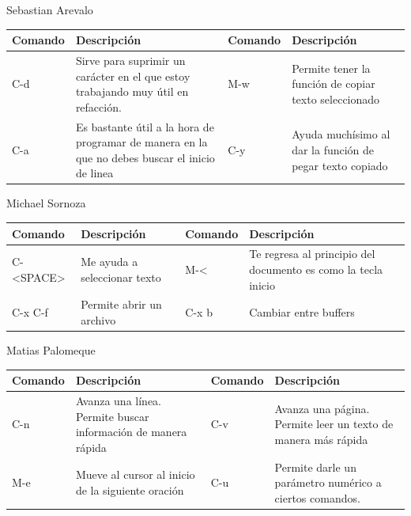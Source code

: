 \documentclass[11pt]{article}
\begin{document}
Sebastian Arevalo
\begin{center}
\begin{tabular}{llll}
Comando & Descripción & Comando & Descripción\\[0pt]
\hline
C-d & Sirve para suprimir un carácter en el que estoy trabajando muy útil en refacción. & M-w & Permite tener la función de copiar texto seleccionado\\[0pt]
C-a & Es bastante útil a la hora de programar de manera en la que no debes buscar el inicio de linea & C-y & Ayuda muchísimo al dar la función de pegar texto copiado\\[0pt]
\end{tabular}
\end{center}

Michael Sornoza

\begin{center}
\begin{tabular}{llll}
Comando & Descripción & Comando & Descripción\\[0pt]
\hline
C-<SPACE> & Me ayuda a seleccionar texto & M-< & Te regresa al principio del documento es como la tecla inicio\\[0pt]
C-x C-f & Permite abrir un archivo & C-x b & Cambiar entre buffers\\[0pt]
\end{tabular}
\end{center}

Matias Palomeque
\begin{center}
\begin{tabular}{llll}
Comando & Descripción & Comando & Descripción\\[0pt]
\hline
C-n & Avanza una línea. Permite buscar información de manera rápida & C-v & Avanza una página. Permite leer un texto de manera más rápida\\[0pt]
M-e & Mueve al cursor al inicio de la siguiente oración & C-u & Permite darle un parámetro numérico a ciertos comandos.\\[0pt]
\end{tabular}
\end{center}
\end{document}
